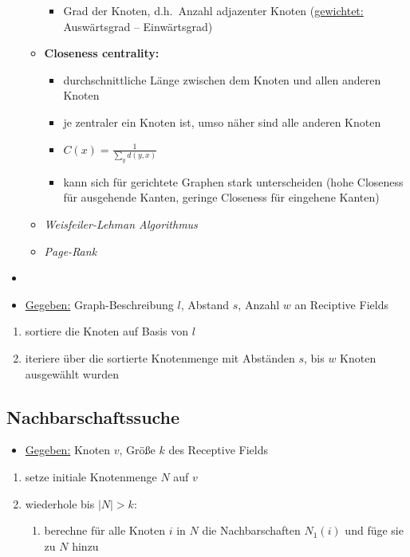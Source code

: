 \begin{itemize}
\begin{itemize}
\begin{itemize}
      \item Grad der Knoten, d.h.\ Anzahl adjazenter Knoten (\underline{gewichtet:} Auswärtsgrad – Einwärtsgrad)
    \end{itemize}
    \item \textbf{Closeness centrality:}
    \begin{itemize}
      \item durchschnittliche Länge zwischen dem Knoten und allen anderen Knoten
      \item je zentraler ein Knoten ist, umso näher sind alle anderen Knoten
      \item $C(x) = \frac{1}{\sum_y d(y,x)}$
      \item kann sich für gerichtete Graphen stark unterscheiden (hohe Closeness für ausgehende Kanten, geringe Closeness für eingehene Kanten)
    \end{itemize}
    \item \emph{Weisfeiler-Lehman Algorithmus}
    \item \emph{Page-Rank}
  \end{itemize}
  \item {}
  \item \underline{Gegeben:} Graph-Beschreibung $l$, Abstand $s$, Anzahl $w$ an Reciptive Fields
\end{itemize}

\begin{enumerate}
  \item sortiere die Knoten auf Basis von $l$
  \item iteriere über die sortierte Knotenmenge mit Abständen $s$, bis $w$ Knoten ausgewählt wurden
\end{enumerate}

\subsection{Nachbarschaftssuche}

\begin{itemize}
  \item \underline{Gegeben:} Knoten $v$, Größe $k$ des Receptive Fields
\end{itemize}

\begin{enumerate}
  \item setze initiale Knotenmenge $N$ auf $v$
  \item wiederhole bis $|N| > k$:
    \begin{enumerate}
      \item berechne für alle Knoten $i$ in $N$ die Nachbarschaften $N_1(i)$ und füge sie zu $N$ hinzu
    \end{enumerate}
\end{enumerate}

